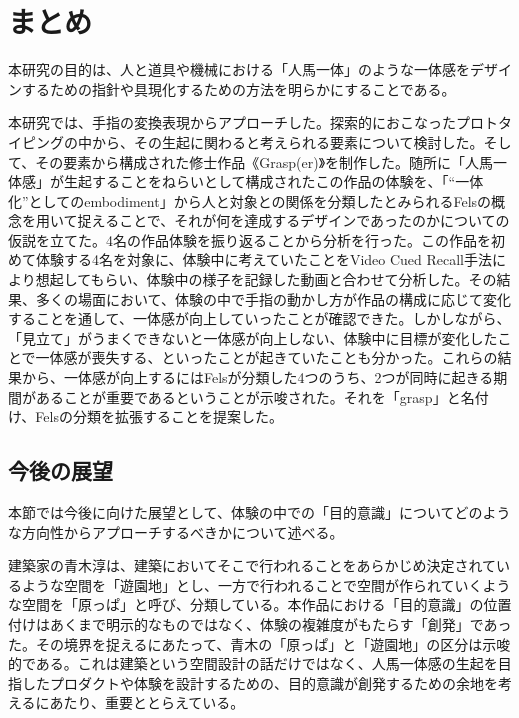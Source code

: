 \chapter{まとめ}
\label{matome}
本研究の目的は、人と道具や機械における「人馬一体」のような一体感をデザインするための指針や具現化するための方法を明らかにすることである。

本研究では、手指の変換表現からアプローチした。探索的におこなったプロトタイピングの中から、その生起に関わると考えられる要素について検討した。そして、その要素から構成された修士作品《Grasp(er)》を制作した。随所に「人馬一体感」が生起することをねらいとして構成されたこの作品の体験を、「``一体化''としてのembodiment」から人と対象との関係を分類したとみられるFelsの概念を用いて捉えることで、それが何を達成するデザインであったのかについての仮説を立てた。4名の作品体験を振り返ることから分析を行った。この作品を初めて体験する4名を対象に、体験中に考えていたことをVideo Cued Recall手法により想起してもらい、体験中の様子を記録した動画と合わせて分析した。その結果、多くの場面において、体験の中で手指の動かし方が作品の構成に応じて変化することを通して、一体感が向上していったことが確認できた。しかしながら、「見立て」がうまくできないと一体感が向上しない、体験中に目標が変化したことで一体感が喪失する、といったことが起きていたことも分かった。これらの結果から、一体感が向上するにはFelsが分類した4つのうち、2つが同時に起きる期間があることが重要であるということが示唆された。それを「grasp」と名付け、Felsの分類を拡張することを提案した。

\section{今後の展望}

本節では今後に向けた展望として、体験の中での「目的意識」についてどのような方向性からアプローチするべきかについて述べる。

建築家の青木淳\cite{aoki2004harappa}は、建築においてそこで行われることをあらかじめ決定されているような空間を「遊園地」とし、一方で行われることで空間が作られていくような空間を「原っぱ」と呼び、分類している。本作品における「目的意識」の位置付けはあくまで明示的なものではなく、体験の複雑度がもたらす「創発」であった。その境界を捉えるにあたって、青木の「原っぱ」と「遊園地」の区分は示唆的である。これは建築という空間設計の話だけではなく、人馬一体感の生起を目指したプロダクトや体験を設計するための、目的意識が創発するための余地を考えるにあたり、重要ととらえている。

